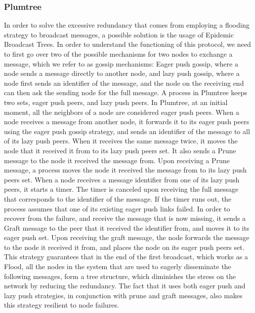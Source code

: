 \documentclass[sigconf]{acmart}
\begin{document}
\subsubsection{Plumtree}

In order to solve the excessive redundancy that comes from employing a flooding strategy to broadcast messages, a possible solution is the usage of Epidemic Broadcast Trees.
In order to understand the functioning of this protocol, we need to first go over two of the possible mechanisms for two nodes to exchange a message, which we refer to as gossip mechanisms:
Eager push gossip, where a node sends a message directly to another node, and lazy push gossip, where a node first sends an identifier of the message, and the node on the receiving end can then ask the sending node for the full message.
A process in Plumtree keeps two sets, eager push peers, and lazy push peers.
In Plumtree, at an initial moment, all the neighbors of a node are considered eager push peers. When a node receives a message from another node, it forwards it to its eager push peers using the eager push gossip strategy, and sends an identifier of the message to all of its lazy push peers. When it receives the same message twice, it moves the node that it received it from to its lazy push peers set. It also sends a Prune message to the node it received the message from. Upon receiving a Prune message, a process moves the node it received the message from to its lazy push peers set.
When a node receives a message identifier from one of its lazy push peers, it starts a timer. The timer is canceled upon receiving the full message that corresponds to the identifier of the message. If the timer runs out, the process assumes that one of its existing eager push links failed. In order to recover from the failure, and receive the message that is now missing, it sends a Graft message to the peer that it received the identifier from, and moves it to its eager push set. Upon receiving the graft message, the node forwards the message to the node it received it from, and places the node on its eager push peers set.
This strategy guarantees that in the end of the first broadcast, which works as a Flood, all the nodes in the system that are used to eagerly disseminate the following messages, form a tree structure, which diminishes the stress on the network by reducing the redundancy.
The fact that it uses both eager push and lazy push strategies, in conjunction with prune and graft messages, also makes this strategy resilient to node failures.
\end{document}
